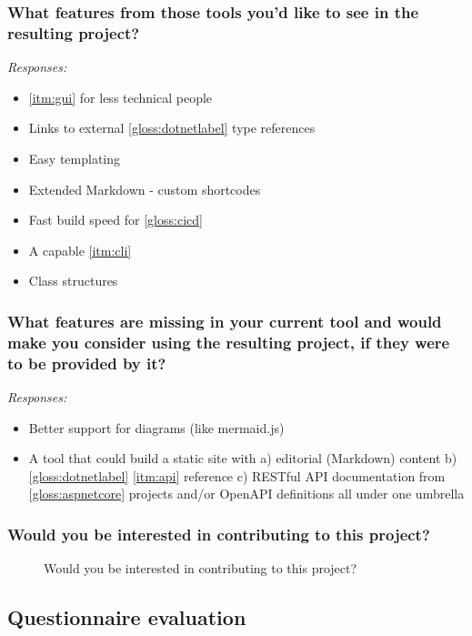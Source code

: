\subsubsection*{What features from those tools you'd like to see in the resulting project?}

\textit{Responses:}
\begin{itemize}
    \item \ref{itm:gui} for less technical people
    \item Links to external \ref{gloss:dotnetlabel} type references
    \item Easy templating
    \item Extended Markdown - custom shortcodes
    \item Fast build speed for \ref{gloss:cicd}
    \item A capable \ref{itm:cli}
    \item Class structures
\end{itemize}

\subsubsection*{What features are missing in your current tool and would make you consider using the resulting project, if they were to be provided by it?}

\textit{Responses:}
\begin{itemize}
    \item Better support for diagrams (like mermaid.js)
    \item A tool that could build a static site with a) editorial (Markdown) content b) \ref{gloss:dotnetlabel} \ref{itm:api} reference c) RESTful API documentation from \ref{gloss:aspnetcore} projects and/or OpenAPI definitions all under one umbrella
\end{itemize}

\subsubsection*{Would you be interested in contributing to this project?}

\begin{figure}[H]
    \centering
    \caption{Would you be interested in contributing to this project?}
\end{figure}

\subsection{Questionnaire evaluation}
